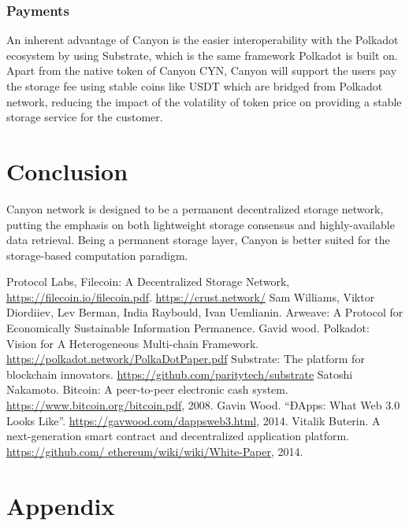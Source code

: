 \documentclass[]{article}
\begin{document}
\subsubsection{Payments}

An inherent advantage of Canyon is the easier interoperability with the Polkadot\cite{polkadot} ecosystem by using Substrate\cite{substrate}, which is the same framework Polkadot is built on. Apart from the native token of Canyon CYN, Canyon will support the users pay the storage fee using stable coins like USDT which are bridged from Polkadot network, reducing the impact of the volatility of token price on providing a stable storage service for the customer.

\section{Conclusion}

Canyon network is designed to be a permanent decentralized storage network, putting the emphasis on both lightweight storage consensus and highly-available data retrieval. Being a permanent storage layer, Canyon is better suited for the storage-based computation paradigm.

\begin{thebibliography}{99}
Protocol Labs, Filecoin: A Decentralized Storage Network, \url{https://filecoin.io/filecoin.pdf}.
\url{https://crust.network/}
Sam Williams, Viktor Diordiiev, Lev Berman, India Raybould, Ivan Uemlianin. Arweave: A Protocol for Economically Sustainable Information Permanence.
Gavid wood. Polkadot: Vision for A Heterogeneous Multi-chain Framework. \url{https://polkadot.network/PolkaDotPaper.pdf}
Substrate: The platform for blockchain innovators. \url{https://github.com/paritytech/substrate}
Satoshi Nakamoto. Bitcoin: A peer-to-peer electronic cash system. \url{https://www.bitcoin.org/bitcoin.pdf}, 2008.
Gavin Wood. “ĐApps: What Web 3.0 Looks Like”. \url{https://gavwood.com/dappsweb3.html}, 2014.
Vitalik Buterin. A next-generation smart contract and decentralized application platform. \url{https://github.com/
ethereum/wiki/wiki/White-Paper}, 2014.
\end{thebibliography}

\appendix
\section{Appendix}
\end{document}
